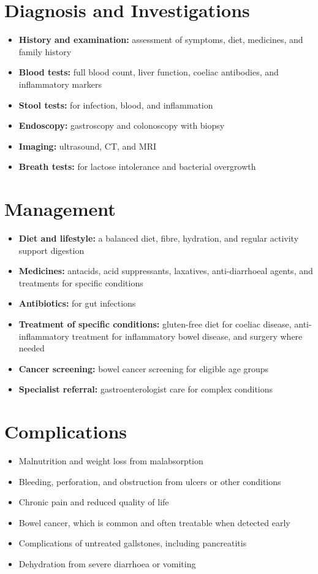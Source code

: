 \section*{Diagnosis and Investigations}
\begin{itemize}
    \item \textbf{History and examination:} assessment of symptoms, diet, medicines, and family history
    \item \textbf{Blood tests:} full blood count, liver function, coeliac antibodies, and inflammatory markers
    \item \textbf{Stool tests:} for infection, blood, and inflammation
    \item \textbf{Endoscopy:} gastroscopy and colonoscopy with biopsy
    \item \textbf{Imaging:} ultrasound, CT, and MRI
    \item \textbf{Breath tests:} for lactose intolerance and bacterial overgrowth
\end{itemize}

\section*{Management}
\begin{itemize}
    \item \textbf{Diet and lifestyle:} a balanced diet, fibre, hydration, and regular activity support digestion
    \item \textbf{Medicines:} antacids, acid suppressants, laxatives, anti-diarrhoeal agents, and treatments for specific conditions
    \item \textbf{Antibiotics:} for gut infections
    \item \textbf{Treatment of specific conditions:} gluten-free diet for coeliac disease, anti-inflammatory treatment for inflammatory bowel disease, and surgery where needed
    \item \textbf{Cancer screening:} bowel cancer screening for eligible age groups
    \item \textbf{Specialist referral:} gastroenterologist care for complex conditions
\end{itemize}

\section*{Complications}
\begin{itemize}
    \item Malnutrition and weight loss from malabsorption
    \item Bleeding, perforation, and obstruction from ulcers or other conditions
    \item Chronic pain and reduced quality of life
    \item Bowel cancer, which is common and often treatable when detected early
    \item Complications of untreated gallstones, including pancreatitis
    \item Dehydration from severe diarrhoea or vomiting
\end{itemize}

